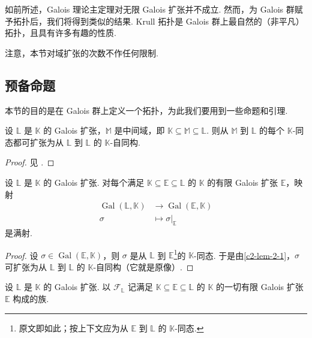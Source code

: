 如前所述，Galois 理论主定理对无限 Galois 扩张并不成立. 然而，为 Galois 群赋予拓扑后，我们将得到类似的结果. Krull 拓扑是 Galois 群上最自然的（非平凡）拓扑，且具有许多有趣的性质.

注意，本节对域扩张的次数不作任何限制.

\subsection{预备命题}

本节的目的是在 Galois 群上定义一个拓扑，为此我们要用到一些命题和引理.

\begin{lemma}\label{c2-lem-2-1}
设 $\mathbb{L}$ 是 $\mathbb{K}$ 的 Galois 扩张，$\mathbb{M}$ 是中间域，即 $\mathbb{K}\subseteq\mathbb{M}\subseteq\mathbb{L}$. 则从 $\mathbb{M}$ 到 $\mathbb{L}$ 的每个 $\mathbb{K}$-同态都可扩张为从 $\mathbb{L}$ 到 $\mathbb{L}$ 的 $\mathbb{K}$-自同构.
\end{lemma}

\begin{proof}
见 \cite[Chapter~7]{mil08}.
\end{proof}

\begin{lemma}\label{c2-lem-2-2}
设 $\mathbb{L}$ 是 $\mathbb{K}$ 的 Galois 扩张. 对每个满足 $\mathbb{K}\subseteq\mathbb{E}\subseteq\mathbb{L}$ 的 $\mathbb{K}$ 的有限 Galois 扩张 $\mathbb{E}$，映射
\[
\begin{aligned}
\operatorname{Gal}(\mathbb{L},\mathbb{K})&\longrightarrow\operatorname{Gal}(\mathbb{E},\mathbb{K})\\
\sigma&\longmapsto\sigma|_{\mathbb{E}}
\end{aligned}
\]
是满射.
\end{lemma}

\begin{proof}
设 $\sigma\in\operatorname{Gal}(\mathbb{E},\mathbb{K})$，则 $\sigma$ 是从 $\mathbb{L}$ 到 $\mathbb{E}$\footnote{原文即如此；按上下文应为从 $\mathbb{E}$ 到 $\mathbb{L}$ 的 $\mathbb{K}$-同态.}的 $\mathbb{K}$-同态. 于是由\autoref{c2-lem-2-1}，$\sigma$ 可扩张为从 $\mathbb{L}$ 到 $\mathbb{L}$ 的 $\mathbb{K}$-自同构（它就是原像）.
\end{proof}

\begin{notation}\label{c2-not-2-1}
设 $\mathbb{L}$ 是 $\mathbb{K}$ 的 Galois 扩张. 以 $\mathcal{F}_{\mathbb{L}}$ 记满足 $\mathbb{K}\subseteq\mathbb{E}\subseteq\mathbb{L}$ 的 $\mathbb{K}$ 的一切有限 Galois 扩张 $\mathbb{E}$ 构成的族.
\end{notation}

